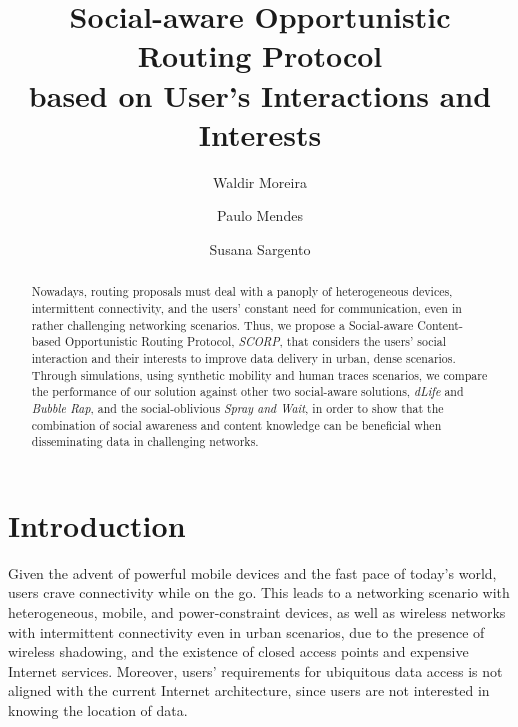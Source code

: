 \documentclass[lnicst]{svmultln}
\begin{document}
\mainmatter              \title{Social-aware Opportunistic Routing Protocol\\
based on User's Interactions and Interests}
  \author{Waldir Moreira \and Paulo Mendes \and Susana
Sargento}
   

\maketitle              

\begin{abstract}        Nowadays, routing proposals must deal with a panoply of heterogeneous
devices, intermittent connectivity, and the users' constant need for
communication, even in rather challenging networking scenarios. Thus,
we propose a Social-aware Content-based Opportunistic Routing Protocol,
\emph{SCORP}, that considers the users' social interaction and their
interests to improve data delivery in urban, dense scenarios. Through
simulations, using synthetic mobility and human traces scenarios,
we compare the performance of our solution against other two social-aware
solutions, \emph{dLife} and \emph{Bubble Rap}, and the social-oblivious
\emph{Spray and Wait}, in order to show that the combination of social
awareness and content knowledge can be beneficial when disseminating
data in challenging networks.
\end{abstract}
\section{Introduction}

Given the advent of powerful mobile devices and the fast pace of today's
world, users crave connectivity while on the go. This leads to a networking
scenario with heterogeneous, mobile, and power-constraint devices,
as well as wireless networks with intermittent connectivity even in
urban scenarios, due to the presence of wireless shadowing, and the
existence of closed access points and expensive Internet services.
Moreover, users' requirements for ubiquitous data access is not aligned
with the current Internet architecture, since users are not interested
in knowing the location of data.
\end{document}
